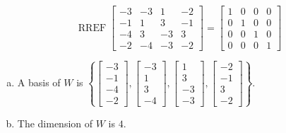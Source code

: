 \begin{exerciseAnswer} 


\[\operatorname{RREF} \left[\begin{array}{cccc}
-3 & -3 & 1 & -2 \\
-1 & 1 & 3 & -1 \\
-4 & 3 & -3 & 3 \\
-2 & -4 & -3 & -2
\end{array}\right] = \left[\begin{array}{cccc}
1 & 0 & 0 & 0 \\
0 & 1 & 0 & 0 \\
0 & 0 & 1 & 0 \\
0 & 0 & 0 & 1
\end{array}\right] \]


\begin{enumerate}[(a)]
\item A basis of \(W\) is \( \left\{ \left[\begin{array}{c}
-3 \\
-1 \\
-4 \\
-2
\end{array}\right] , \left[\begin{array}{c}
-3 \\
1 \\
3 \\
-4
\end{array}\right] , \left[\begin{array}{c}
1 \\
3 \\
-3 \\
-3
\end{array}\right] , \left[\begin{array}{c}
-2 \\
-1 \\
3 \\
-2
\end{array}\right] \right\} \).
\item The dimension of \(W\) is \( 4 \).
\end{enumerate}
    
\end{exerciseAnswer}
    
